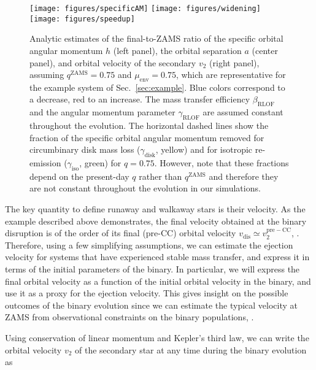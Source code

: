 \documentclass{aa}
\DeclareRobustCommand{\Secref}[1]{Sec.~\ref{#1}}
\begin{document}
\begin{figure*}[htb]
  \centering
  \texttt{[image: figures/specificAM]}
  \texttt{[image: figures/widening]}
  \texttt{[image: figures/speedup]}
  \caption{Analytic estimates of the final-to-ZAMS ratio of the
     specific orbital angular momentum $h$ (left panel), the orbital
     separation $a$ (center panel), and orbital velocity of the
     secondary $v_2$ (right panel), assuming $q^\mathrm{ZAMS}=0.75$ and
     $\mu_\mathrm{env}=0.75$, which are representative for the example
     system of \Secref{sec:example}. Blue colors correspond to a
     decrease, red to an increase. The mass transfer efficiency
     $\beta_\mathrm{RLOF}$ and the angular momentum parameter
     $\gamma_\mathrm{RLOF}$ are assumed constant throughout the
     evolution. The horizontal dashed lines show the fraction of the specific
     orbital angular momentum removed for circumbinary disk mass loss
     ($\gamma_\mathrm{disk}$, yellow) and for isotropic re-emission
     ($\gamma_\mathrm{iso}$, green) for $q=0.75$. However, note that
     these fractions depend on the present-day $q$ rather than
     $q^\mathrm{ZAMS}$ and therefore they are not constant throughout the evolution in our simulations.}
   \label{fig:speedup_factor}
 \end{figure*}
 


The key quantity to define runaway and walkaway stars is their velocity.
As the example described above demonstrates, the final velocity
obtained at the binary disruption is of the
order of its final (pre-CC) orbital velocity $v_\mathrm{dis}\simeq
v_2^\mathrm{pre-CC}$, \citep[][]{blaauw:61,
  eldridge:11}. Therefore, using a few simplifying assumptions, we can
estimate the ejection velocity for systems that have experienced stable mass transfer, and express it in terms of the initial
parameters of the binary. In particular, we will express the final
orbital velocity as a function of the initial orbital velocity in the
binary, and use it as a proxy for the ejection velocity. This gives
insight on the possible outcomes of the binary evolution since we can estimate the typical velocity at ZAMS from
observational constraints on the binary populations, \citep[e.g.,][]{sana:12}.

Using conservation of linear momentum and
Kepler's third law, we can write the orbital velocity $v_2$ of the
secondary star at any time during the binary evolution as
\end{document}
